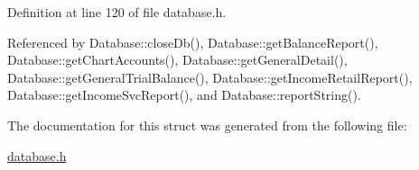 Definition at line 120 of file database.h.

Referenced by Database::close\-Db(), Database::get\-Balance\-Report(), Database::get\-Chart\-Accounts(), Database::get\-General\-Detail(), Database::get\-General\-Trial\-Balance(), Database::get\-Income\-Retail\-Report(), Database::get\-Income\-Svc\-Report(), and Database::report\-String().

The documentation for this struct was generated from the following file:\begin{CompactItemize}
\item 
\hyperlink{database_8h}{database.h}\end{CompactItemize}
